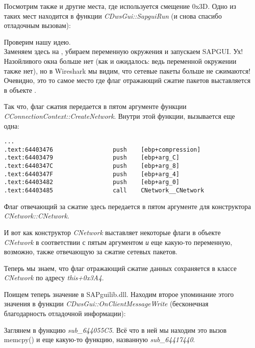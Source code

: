 Посмотрим также и другие места, где используется смещение 0x3D.
Одно из таких мест находится в функции \emph{CDwsGui::SapguiRun} (и снова спасибо отладочным вызовам):



Проверим нашу идею.\\
Заменяем  здесь на , убираем переменную окружения 
\TDWNC и запускаем SAPGUI. Ух! Назойливого окна больше нет (как и ожидалось: ведь переменной окружении также
нет), но в Wireshark мы видим, что сетевые пакеты больше не сжимаются!
Очевидно, это то самое место где флаг отражающий сжатие пакетов выставляется в объекте .

Так что, флаг сжатия передается в пятом аргументе функции \emph{CConnectionContext::CreateNetwork}. 
Внутри этой функции, вызывается еще одна:

\begin{lstlisting}[style=customasmx86]
...
.text:64403476                 push    [ebp+compression]
.text:64403479                 push    [ebp+arg_C]
.text:6440347C                 push    [ebp+arg_8]
.text:6440347F                 push    [ebp+arg_4]
.text:64403482                 push    [ebp+arg_0]
.text:64403485                 call    CNetwork__CNetwork
\end{lstlisting}

Флаг отвечающий за сжатие здесь передается в пятом аргументе для конструктора \emph{CNetwork::CNetwork}.

И вот как конструктор \emph{CNetwork} выставляет некоторые флаги в объекте \emph{CNetwork} в соответствии с пятым аргументом \emph{и}
еще какую-то переменную, возможно, также отвечающую за сжатие сетевых пакетов.



Теперь мы знаем, что флаг отражающий сжатие данных сохраняется в классе \emph{CNetwork} по адресу \emph{this+0x3A4}.

Поищем теперь значение  в SAPguilib.dll. Находим второе упоминание этого значения в функции
\emph{CDwsGui::OnClientMessageWrite} (бесконечная благодарность отладочной информации):



Заглянем в функцию \emph{sub\_644055C5}. Всё что в ней мы находим это вызов memcpy() и еще какую-то функцию, названную
\IDA \emph{sub\_64417440}.

